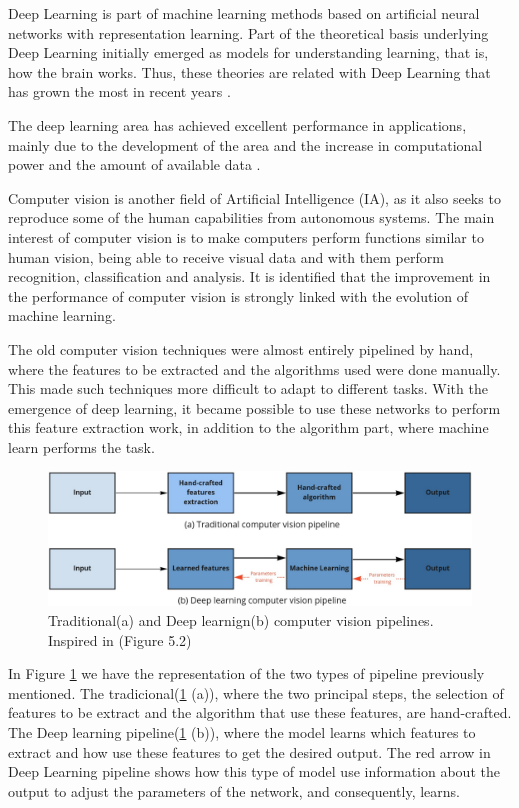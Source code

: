  Deep Learning is part of machine learning methods based on artificial neural networks with representation learning. %
 Part of the theoretical basis underlying Deep Learning  initially emerged as models for understanding learning, that is, how the brain works. Thus, these theories are related with Deep Learning  that has grown the most in recent years \cite{goodfellow2016}.

The deep learning area has achieved excellent performance in applications, mainly due to the development of the area and the increase in computational power and the amount of available data \cite{geron2019}. 

Computer vision is another field of Artificial Intelligence (IA), as it also seeks to reproduce some of the human capabilities from autonomous systems. The main interest of computer vision is to make computers perform functions similar to human vision, being able to receive visual data and with them perform recognition, classification and analysis. It is identified that the improvement in the performance of computer vision is strongly linked with the evolution of machine learning.

The old computer vision techniques were almost entirely pipelined by hand, where the features to be extracted and the algorithms used were done manually. This made such techniques more difficult to adapt to different tasks. With the emergence of deep learning, it became possible to use these networks to perform this feature extraction work, in addition to the algorithm part, where machine learn performs the task.

\begin{figure}
    \centering
    \includegraphics[scale=0.20]{images/cvpipeline.png}
    \caption{Traditional(a) and Deep learnign(b) computer vision pipelines. Inspired in \cite{szeliski2010computer}(Figure 5.2)}
    \label{fig:figurecvpipeline}
\end{figure}

In Figure \ref{fig:figurecvpipeline} we have the representation of the two types of pipeline previously mentioned. The tradicional(\ref{fig:figurecvpipeline} (a)), where the two principal steps, the selection of features to be extract and the algorithm that use these features, are hand-crafted. The Deep learning pipeline(\ref{fig:figurecvpipeline} (b)), where the model learns which features to extract and how use these features to get the desired output. The red arrow in Deep Learning pipeline shows how this type of model use information about the output to adjust the parameters of the network, and consequently, learns.

